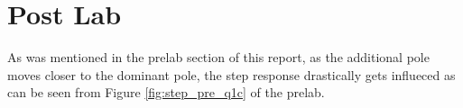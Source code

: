 \documentclass[12pt, a4paper]{article}
\begin{document}
	
	

	\section{Post Lab} %
	\label{sec:post_lab}
	As was mentioned in the prelab section of this report, as the additional pole moves closer to the dominant pole, the step response drastically gets influeced as can be seen from Figure \ref{fig:step_pre_q1c} of the prelab.
	

			
\end{document}

